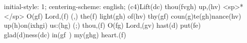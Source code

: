initial-style: 1;
centering-scheme: english;
(c4)Lift(dc) thou(fvgh) up,(hv) <sp>*</sp> O(gf) Lord,(f) (,) the(f) light(gh) of(hv) thy(gf) coun(g)te(gh)nance(hv) up(h)on(ixhgi) us:(hg) (;) thou,(f) O(fg) Lord,(gv) hast(d) put(fe) glad(d)ness(dc) in(gf~) my(ghg) heart.(f)
